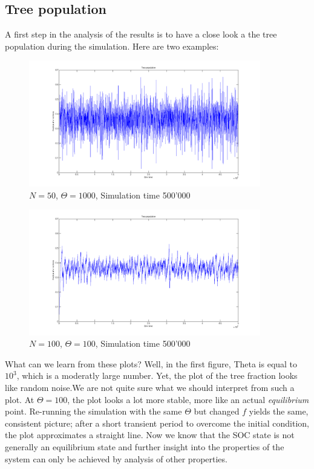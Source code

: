 \documentclass[11pt]{article}
\begin{document}
\subsection{Tree population}
A first step in the analysis of the results is to have a close look a the tree population during the simulation. Here are two examples:
\begin{figure}[H]
\centering
\includegraphics[width=0.9\textwidth,keepaspectratio=true,]{Pictures/Tree_Pop_50_1000_500000.png}
\caption{$N=50$, $\Theta=1000$, Simulation time 500'000}
\end{figure}
\begin{figure}[H]
\centering
\includegraphics[width=0.9\textwidth,keepaspectratio=true,]{Pictures/Tree_Pop_100_100_500000.png}
\caption{$N=100$, $\Theta=100$, Simulation time 500'000}
\end{figure}
What can we learn from these plots? Well, in the first figure, Theta is equal to $10^3$, which is a moderatly large number. Yet, the plot of the tree fraction looks like random noise.We are not quite sure what we should interpret from such a plot. At $\Theta=100$, the plot looks a lot more stable, more like an actual \emph{equilibrium} point. Re-running the simulation with the same $\Theta$ but changed $f$ yields the same, consistent picture; after a short transient period to overcome the initial condition, the plot approximates a straight line. 
Now we know that the SOC state is not generally an equilibrium state and further insight into the properties of the system can only be achieved by analysis of other properties.
\end{document}
